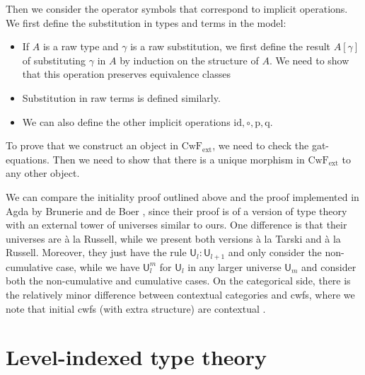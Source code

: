 \documentclass[11pt,a4paper]{article}
\theoremstyle{plain}
\theoremstyle{definition}
\newcommand{\id}{\mathsf{id}}
\newcommand{\UU}{\mathsf{U}}
\def\UU{\mathsf{U}}
\def\id{\mathrm{id}}
\def\p{\mathrm{p}}
\def\q{\mathrm{q}}
\def\CwFext{\mathrm{CwF_{ext}}}
\begin{document}
Then we consider the operator symbols that correspond to implicit operations. We first define the substitution in types and terms in the model:
\begin{itemize}
\item If $A$ is a raw type and $\gamma$ is a raw substitution, we first define the result $A[\gamma]$ of substituting $\gamma$ in $A$ by induction on the structure of $A$. We need to show that this operation preserves equivalence classes
\item Substitution in raw terms is defined similarly.
\item We can also define the other implicit operations $\id, \circ, \p, \q$.
\end{itemize}
To prove that we construct an object in $\CwFext$, we need to check the gat-equations. Then we need to show that there is a unique morphism in $\CwFext$ to any other object.

We can compare the initiality proof outlined above and the proof implemented in Agda by Brunerie and de Boer \cite{Brunerie:initiality,deBoer:lic}, since their proof is of a version of type theory with an external tower of universes similar to ours. One difference is that their universes are \`a la Russell, while we present both versions \`a la Tarski and \`a la Russell. Moreover, they just have the rule $\UU_l : \UU_{l+1}$ and only consider the non-cumulative case, while we have $\UU_l^m$ for $\UU_l$ in any larger universe $\UU_m$ and consider both the non-cumulative and cumulative cases. On the categorical side, there is the relatively minor difference between contextual categories and cwfs, where we note that initial cwfs (with extra structure) are contextual \cite{ClairambaultD11,castellan:lambek}. 

\section{Level-indexed type theory}\label{level-indexed-tt}
\end{document}

